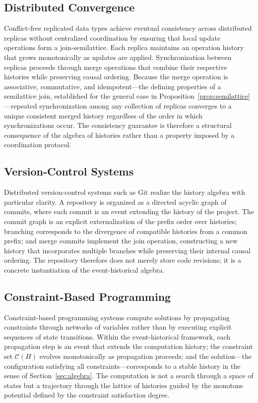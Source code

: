 \documentclass[12pt]{article}
\begin{document}
\subsection{Distributed Convergence}

Conflict-free replicated data types \cite{shapiro2011} achieve eventual consistency across distributed replicas without centralized coordination by ensuring that local update operations form a join-semilattice. Each replica maintains an operation history that grows monotonically as updates are applied. Synchronization between replicas proceeds through merge operations that combine their respective histories while preserving causal ordering. Because the merge operation is associative, commutative, and idempotent---the defining properties of a semilattice join, established for the general case in Proposition~\ref{prop:semilattice}---repeated synchronization among any collection of replicas converges to a unique consistent merged history regardless of the order in which synchronizations occur. The consistency guarantee is therefore a structural consequence of the algebra of histories rather than a property imposed by a coordination protocol.

\subsection{Version-Control Systems}

Distributed version-control systems such as Git \cite{chacon2014} realize the history algebra with particular clarity. A repository is organized as a directed acyclic graph of commits, where each commit is an event extending the history of the project. The commit graph is an explicit externalization of the prefix order over histories; branching corresponds to the divergence of compatible histories from a common prefix; and merge commits implement the join operation, constructing a new history that incorporates multiple branches while preserving their internal causal ordering. The repository therefore does not merely store code revisions; it is a concrete instantiation of the event-historical algebra.

\subsection{Constraint-Based Programming}

Constraint-based programming systems compute solutions by propagating constraints through networks of variables rather than by executing explicit sequences of state transitions. Within the event-historical framework, each propagation step is an event that extends the computation history; the constraint set $\mathcal{C}(H)$ evolves monotonically as propagation proceeds; and the solution---the configuration satisfying all constraints---corresponds to a stable history in the sense of Section~\ref{sec:algebra}. The computation is not a search through a space of states but a trajectory through the lattice of histories guided by the monotone potential defined by the constraint satisfaction degree.
\end{document}
